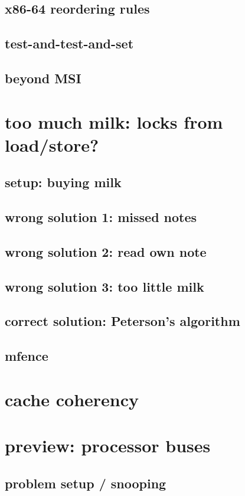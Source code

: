 \subsection{x86-64 reordering rules}




\subsection{test-and-test-and-set}




\subsection{beyond MSI}

\section{too much milk: locks from load/store?}

\subsection{setup: buying milk}


\subsection{wrong solution 1: missed notes}


\subsection{wrong solution 2: read own note}


\subsection{wrong solution 3: too little milk}


\subsection{correct solution: Peterson's algorithm}


\subsection{mfence}



\section{cache coherency}
\section{preview: processor buses}


\subsection{problem setup / snooping}

